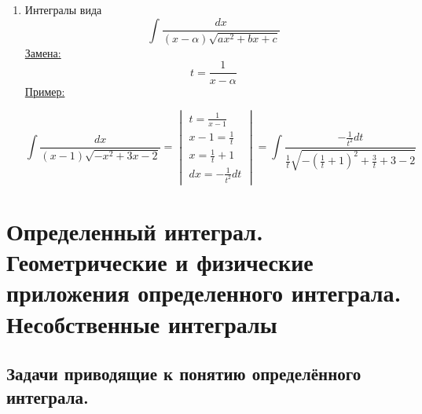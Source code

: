 \documentclass[12pt]{article}
\begin{document}
\begin{enumerate}
        \item Интегралы вида
        \[ \int \frac{dx}{(x-\alpha)\sqrt{ax^2 + bx + c}} \]
        \underline{Замена:} 
        \[ \boxed{t = \frac{1}{x-\alpha}} \]
        \underline{Пример:}
        \begin{adjustwidth}{1.5em}{1.5em}
            \[ \int \frac{dx}{(x-1)\sqrt{-x^2+3x-2}} = \begin{vmatrix}
                t = \frac{1}{x-1}\\
                x - 1 = \frac{1}{t}\\
                x = \frac{1}{t} + 1\\
                dx = -\frac{1}{t^2}dt
            \end{vmatrix} = \int \frac{-\frac{1}{t^2}dt}{\frac{1}{t}\sqrt{-\left( \frac{1}{t} + 1 \right)^2 + \frac{3}{t} + 3 - 2}} \]
        \end{adjustwidth}
    \end{enumerate}

    \section{Определенный интеграл. Геометрические и физические приложения определенного интеграла. Несобственные интегралы}
    \subsection{Задачи приводящие к понятию определённого интеграла.}
\end{document}
